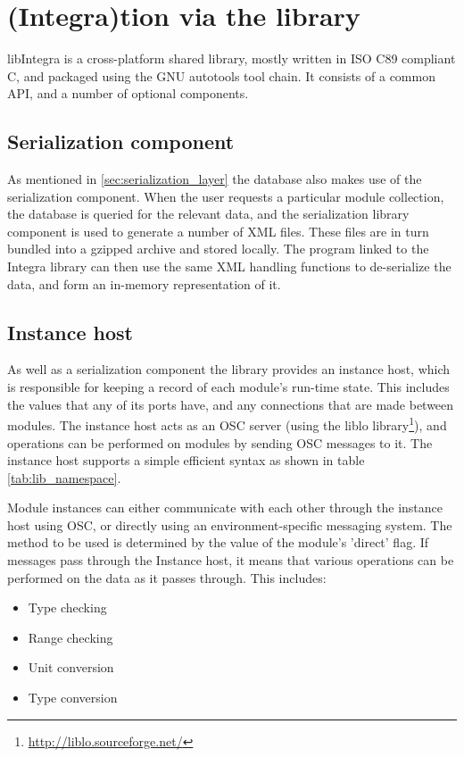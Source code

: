 \documentclass{article}
\begin{document}
\section{(Integra)tion via the library}\label{subsec:db_lib}

libIntegra is a cross-platform shared library, mostly written in ISO C89 compliant C, and packaged using the GNU autotools tool chain. It consists of a common API, and a number of optional components.

\subsection{Serialization component}\label{subsec:serialization}

As mentioned in \ref{sec:serialization_layer} the database also makes use of the serialization component. When the user requests a particular module collection, the database is queried for the relevant data, and the serialization library component is used to generate a number of XML files. These files are in turn bundled into a gzipped archive and stored locally. The program linked to the Integra library can then use the same XML handling functions to de-serialize the data, and form an in-memory representation of it.

\subsection{Instance host}\label{subsec:instance_host}

As well as a serialization component the library provides an instance host, which is responsible for keeping a record of each module's run-time state. This includes the values that any of its ports have, and any connections that are made between modules. The instance host acts as an OSC server (using the liblo library\footnote{\url{http://liblo.sourceforge.net/}}), and operations can be performed on modules by sending OSC messages to it. The instance host supports a simple efficient syntax as shown in table \ref{tab:lib_namespace}.

Module instances can either communicate with each other through the instance host using OSC, or directly using an environment-specific messaging system. The method to be used is determined by the value of the module's 'direct' flag. If messages pass through the Instance host, it means that various operations can be performed on the data as it passes through. This includes:
\begin{itemize}
\item Type checking
\item Range checking
\item Unit conversion
\item Type conversion
\end{itemize}
\end{document}
